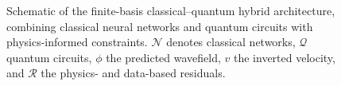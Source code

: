 \begin{figure}[h!]
{%
}
\caption{Schematic of the finite-basis classical--quantum hybrid architecture,
combining classical neural networks and quantum circuits with physics-informed constraints.
$\mathcal{N}$ denotes classical networks, $\mathcal{Q}$ quantum circuits, $\phi$ the predicted wavefield, $v$ the inverted velocity, and $\mathcal{R}$ the physics- and data-based residuals.}






\label{fig:hybrid_arch}

\end{figure}




